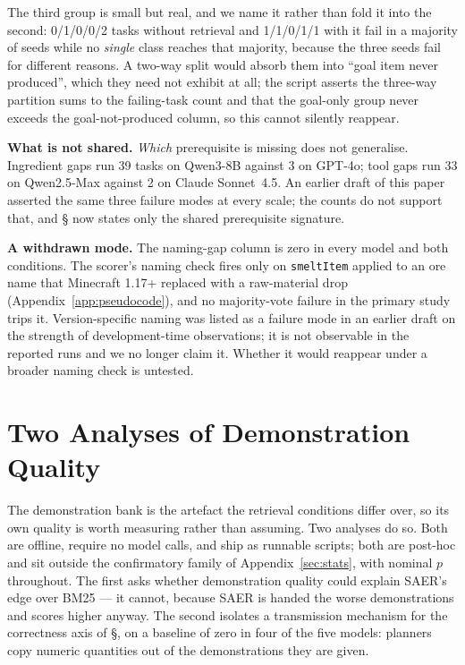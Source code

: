 \documentclass[letterpaper]{article} %
\newcommand{\appref}[1]{Appendix~\ref{#1}}
\newcommand{\bodyref}[1]{\getrefnumber{#1}}
\begin{document}
The third group is small but real, and we name it rather than fold it into
the second: 0/1/0/0/2 tasks without retrieval and 1/1/0/1/1 with it fail in a
majority of seeds while no \emph{single} class reaches that majority, because
the three seeds fail for different reasons.  A two-way split would absorb
them into ``goal item never produced'', which they need not exhibit at all;
the script asserts the three-way partition sums to the failing-task count and
that the goal-only group never exceeds the goal-not-produced column, so this
cannot silently reappear.

\textbf{What is not shared.}  \emph{Which} prerequisite is missing does
not generalise.  Ingredient gaps run 39 tasks on Qwen3-8B against 3 on
GPT-4o; tool gaps run 33 on Qwen2.5-Max against 2 on Claude Sonnet~4.5.
An earlier draft of this paper asserted the same three failure modes at
every scale; the counts do not support that, and \S\bodyref{sec:knowledge_gap}
now states only the shared prerequisite signature.

\textbf{A withdrawn mode.}  The naming-gap column is zero in every model
and both conditions.  The scorer's naming check fires only on
\texttt{smeltItem} applied to an ore name that Minecraft 1.17+ replaced
with a raw-material drop (\appref{app:pseudocode}), and no majority-vote
failure in the primary study trips it.  Version-specific naming was
listed as a failure mode in an earlier draft on the strength of
development-time observations; it is not observable in the reported runs
and we no longer claim it.  Whether it would reappear under a broader
naming check is untested.


\section{Two Analyses of Demonstration Quality}
\label{app:demoquality}

The demonstration bank is the artefact the retrieval conditions differ
over, so its own quality is worth measuring rather than assuming.  Two
analyses do so.  Both are offline, require no model calls, and ship as
runnable scripts; both are post-hoc and sit outside the confirmatory
family of \appref{sec:stats}, with nominal $p$ throughout.  The first
asks whether demonstration quality could explain SAER's edge over BM25
--- it cannot, because SAER is handed the worse demonstrations and
scores higher anyway.  The second isolates a transmission mechanism for
the correctness axis of \S\bodyref{sec:knowledge_gap}, on a baseline of
zero in four of the five models: planners copy numeric quantities out of the
demonstrations they are given.
\end{document}
